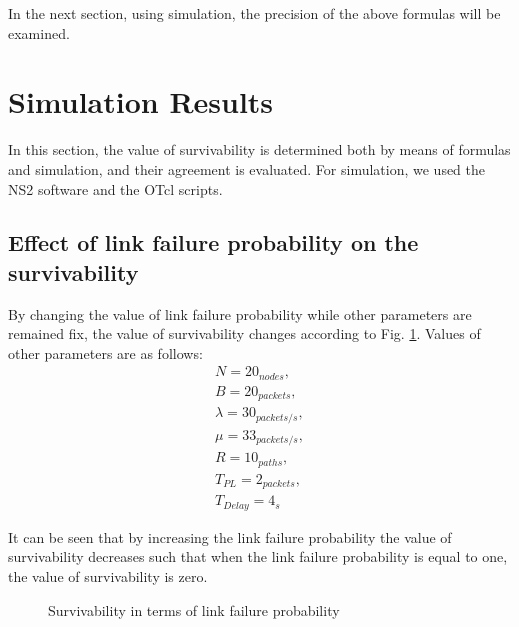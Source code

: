 \documentclass[onecolumn,conference]{IEEEtran}
\begin{document}
    In the next section, using simulation, the precision of the above formulas will be examined.

    \section{Simulation Results} \label{sec:simres}
    In this section, the value of survivability is determined both by means of formulas and simulation, and their agreement is evaluated. For simulation, we used the NS2 software and the OTcl scripts.

    \subsection{Effect of link failure probability on the survivability}
    By changing the value of link failure probability while other parameters are remained fix, the value of survivability changes according to Fig. \ref{fig:3}. Values of other parameters are as follows:
    \begin{equation}
        \begin{split}
            N=20_{nodes},\\
            B=20_{packets},\\
            \lambda=30_{packets/s},\\
            \mu=33_{packets/s},\\
            R=10_{paths},\\
            T_{PL}=2_{packets},\\
            T_{Delay}=4_s
        \end{split}
    \end{equation}

    It can be seen that by increasing the link failure probability the value of survivability decreases such that when the link failure probability is equal to one, the value of survivability is zero.

    \begin{figure}[htbp]
        \centering
        \caption{Survivability in terms of link failure probability}
        \label{fig:3}
    \end{figure}
\end{document}

